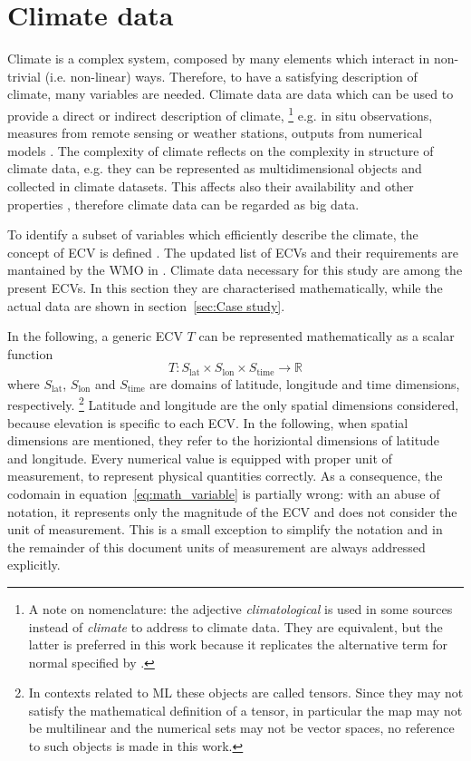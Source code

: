 \section{Climate data}
\label{sec:Climate data}
Climate is a complex system, composed by many elements which interact in non-trivial (i.e. non-linear) ways. Therefore, to have a satisfying description of climate, many variables are needed. Climate data are data which can be used to provide a direct or indirect description of climate,%
\footnote{A note on nomenclature: the adjective \emph{climatological} is used in some sources instead of \emph{climate} to address to climate data. They are equivalent, but the latter is preferred in this work because it replicates the alternative term for \gls{normal} specified by \cite[1]{2017WorldMeteorologicalOrganizationWMOWMOGuidelines}.}
e.g. in situ observations, measures from remote sensing or weather stations, outputs from numerical models \cite[1537]{2021SeneviratneWeatherAnd}. The complexity of climate reflects on the complexity in structure of climate data, e.g. they can be represented as multidimensional objects and collected in climate datasets. This affects also their availability and other properties \cite{2014FaghmousABig}, therefore climate data can be regarded as big data.

To identify a subset of variables which efficiently describe the climate, the concept of \gls{ECV} is defined \cite{2014BojinskiTheConcept}. The updated list of \glspl{ECV} and their requirements are mantained by the \gls{WMO} in \cite[14-17]{2022WorldMeteorologicalOrganizationWMOThe2022}.
Climate data necessary for this study are among the present \glspl{ECV}. In this section they are characterised mathematically, while the actual data are shown in section~\ref{sec:Case study}.

In the following, a generic \gls{ECV} $T$ can be represented mathematically as a scalar function
\begin{equation}
  \label{eq:math_variable}
  T : S_\text{lat} \times S_\text{lon} \times S_\text{time} \to \mathbb{R}
\end{equation}
where $S_\text{lat}$, $S_\text{lon}$ and $S_\text{time}$ are domains of latitude, longitude and time dimensions, respectively.%
\footnote{In contexts related to \gls{ML} these objects are called tensors. Since they may not satisfy the mathematical definition of a tensor, in particular the map may not be multilinear and the numerical sets may not be vector spaces, no reference to such objects is made in this work.}
Latitude and longitude are the only spatial dimensions considered, because elevation is specific to each \gls{ECV}. In the following, when spatial dimensions are mentioned, they refer to the horiziontal dimensions of latitude and longitude.
Every numerical value is equipped with proper unit of measurement, to represent physical quantities correctly. As a consequence, the codomain in equation~\eqref{eq:math_variable} is partially wrong: with an abuse of notation, it represents only the magnitude of the \gls{ECV} and does not consider the unit of measurement. This is a small exception to simplify the notation and in the remainder of this document units of measurement are always addressed explicitly.

